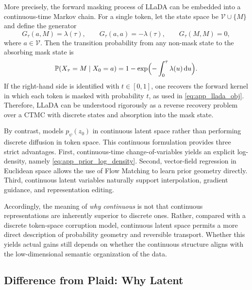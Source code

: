 More precisely, the forward masking process of LLaDA can be embedded into a continuous-time Markov chain. For a single token, let the state space be $\mathcal V\cup\{M\}$ and define the generator
\begin{equation}
G_{\tau}(a,M)=\lambda(\tau),
\qquad
G_{\tau}(a,a)=-\lambda(\tau),
\qquad
G_{\tau}(M,M)=0,
\label{eq:app_llada_ctmc_generator}
\end{equation}
where $a\in\mathcal V$. Then the transition probability from any non-mask state to the absorbing mask state is
\begin{equation}
\mathbb P(X_{\tau}=M\mid X_0=a)
=
1-\exp\Bigl(-\int_0^{\tau}\lambda(u)\,\mathrm{d} u\Bigr).
\label{eq:app_llada_mask_probability}
\end{equation}
If the right-hand side is identified with $t\in[0,1]$, one recovers the forward kernel in which each token is masked with probability $t$, as used in \eqref{eq:app_llada_obj}. Therefore, LLaDA can be understood rigorously as a reverse recovery problem over a CTMC with discrete states and absorption into the mask state.

By contrast, \method models $p_{\psi}(z_0)$ in continuous latent space rather than performing discrete diffusion in token space. This continuous formulation provides three strict advantages. First, continuous-time change-of-variables yields an explicit log-density, namely \eqref{eq:app_prior_log_density}. Second, vector-field regression in Euclidean space allows the use of Flow Matching to learn prior geometry directly. Third, continuous latent variables naturally support interpolation, gradient guidance, and representation editing.

Accordingly, the meaning of \emph{why continuous} is not that continuous representations are inherently superior to discrete ones. Rather, compared with a discrete token-space corruption model, continuous latent space permits a more direct description of probability geometry and reversible transport. Whether this yields actual gains still depends on whether the continuous structure aligns with the low-dimensional semantic organization of the data.

\subsection{Difference from Plaid: Why Latent}
\label{app:why_latent}

